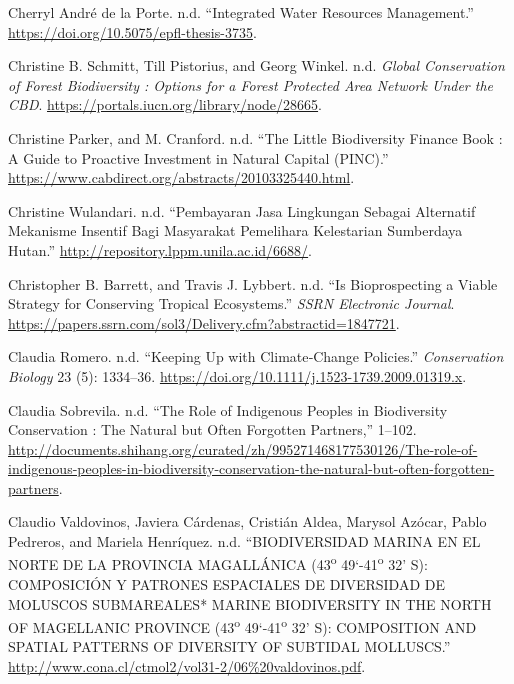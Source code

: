 \begin{CSLReferences}{1}{0}
Cherryl André de la Porte. n.d. {``Integrated Water Resources
Management.''} \url{https://doi.org/10.5075/epfl-thesis-3735}.

Christine B. Schmitt, Till Pistorius, and Georg Winkel. n.d.
\emph{Global Conservation of Forest Biodiversity : Options for a Forest
Protected Area Network Under the CBD}.
\url{https://portals.iucn.org/library/node/28665}.

Christine Parker, and M. Cranford. n.d. {``The Little Biodiversity
Finance Book : A Guide to Proactive Investment in Natural Capital
(PINC).''} \url{https://www.cabdirect.org/abstracts/20103325440.html}.

Christine Wulandari. n.d. {``Pembayaran Jasa Lingkungan Sebagai
Alternatif Mekanisme Insentif Bagi Masyarakat Pemelihara Kelestarian
Sumberdaya Hutan.''} \url{http://repository.lppm.unila.ac.id/6688/}.

Christopher B. Barrett, and Travis J. Lybbert. n.d. {``Is Bioprospecting
a Viable Strategy for Conserving Tropical Ecosystems.''} \emph{SSRN
Electronic Journal}.
\url{https://papers.ssrn.com/sol3/Delivery.cfm?abstractid=1847721}.

Claudia Romero. n.d. {``Keeping Up with Climate‐Change Policies.''}
\emph{Conservation Biology} 23 (5): 1334--36.
\url{https://doi.org/10.1111/j.1523-1739.2009.01319.x}.

Claudia Sobrevila. n.d. {``The Role of Indigenous Peoples in
Biodiversity Conservation : The Natural but Often Forgotten Partners,''}
1--102.
\url{http://documents.shihang.org/curated/zh/995271468177530126/The-role-of-indigenous-peoples-in-biodiversity-conservation-the-natural-but-often-forgotten-partners}.

Claudio Valdovinos, Javiera Cárdenas, Cristián Aldea, Marysol Azócar,
Pablo Pedreros, and Mariela Henríquez. n.d. {``BIODIVERSIDAD MARINA EN
EL NORTE DE LA PROVINCIA MAGALLÁNICA (43\textsuperscript{o}
49{`-41\textsuperscript{o} 32'} S): COMPOSICIÓN Y PATRONES ESPACIALES DE
DIVERSIDAD DE MOLUSCOS SUBMAREALES* MARINE BIODIVERSITY IN THE NORTH OF
MAGELLANIC PROVINCE (43\textsuperscript{o} 49{`-41\textsuperscript{o}
32'} S): COMPOSITION AND SPATIAL PATTERNS OF DIVERSITY OF SUBTIDAL
MOLLUSCS.''}
\url{http://www.cona.cl/ctmol2/vol31-2/06\%20valdovinos.pdf}.


\end{CSLReferences}
